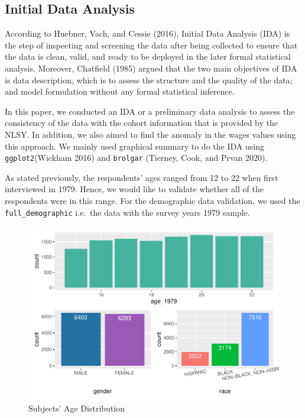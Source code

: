 \documentclass{article}
\begin{document}
\hypertarget{initial-data-analysis}{%
\subsection{Initial Data Analysis}\label{initial-data-analysis}}

According to Huebner, Vach, and Cessie (2016), Initial Data Analysis
(IDA) is the step of inspecting and screening the data after being
collected to ensure that the data is clean, valid, and ready to be
deployed in the later formal statistical analysis. Moreover, Chatfield
(1985) argued that the two main objectives of IDA is data description,
which is to assess the structure and the quality of the data; and model
formulation without any formal statistical inference.

In this paper, we conducted an IDA or a preliminary data analysis to
assess the consistency of the data with the cohort information that is
provided by the NLSY. In addition, we also aimed to find the anomaly in
the wages values using this approach. We mainly used graphical summary
to do the IDA using \texttt{ggplot2}(Wickham 2016) and \texttt{brolgar}
(Tierney, Cook, and Prvan 2020).

As stated previously, the respondents' ages ranged from 12 to 22 when
first interviewed in 1979. Hence, we would like to validate whether all
of the respondents were in this range. For the demographic data
validation, we used the \texttt{full\_demographic} i.e.~the data with
the survey years 1979 sample.

\begin{figure}
\centering
\includegraphics{report_files/figure-latex/valid-age-1.pdf}
\caption{Subjects' Age Distribution}
\end{figure}
\end{document}
